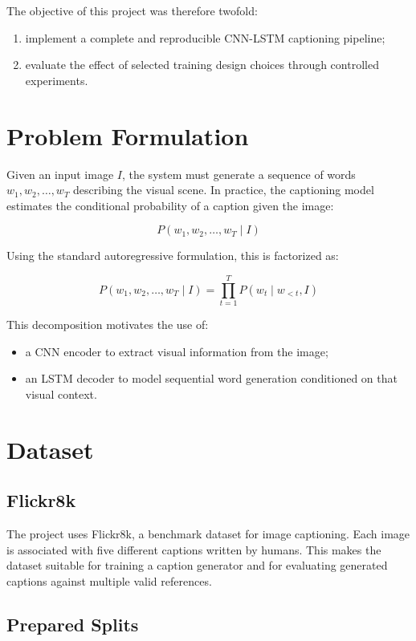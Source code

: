 \documentclass[11pt,a4paper]{article}
\begin{document}
The objective of this project was therefore twofold:
\begin{enumerate}[leftmargin=*]
    \item implement a complete and reproducible CNN-LSTM captioning pipeline;
    \item evaluate the effect of selected training design choices through controlled experiments.
\end{enumerate}

\section{Problem Formulation}

Given an input image \(I\), the system must generate a sequence of words \(w_1, w_2, \dots, w_T\) describing the visual scene. In practice, the captioning model estimates the conditional probability of a caption given the image:

\[
P(w_1, w_2, \dots, w_T \mid I)
\]

Using the standard autoregressive formulation, this is factorized as:

\[
P(w_1, w_2, \dots, w_T \mid I) = \prod_{t=1}^{T} P(w_t \mid w_{<t}, I)
\]

This decomposition motivates the use of:
\begin{itemize}[leftmargin=*]
    \item a CNN encoder to extract visual information from the image;
    \item an LSTM decoder to model sequential word generation conditioned on that visual context.
\end{itemize}

\section{Dataset}

\subsection{Flickr8k}

The project uses Flickr8k, a benchmark dataset for image captioning. Each image is associated with five different captions written by humans. This makes the dataset suitable for training a caption generator and for evaluating generated captions against multiple valid references.

\subsection{Prepared Splits}
\end{document}

